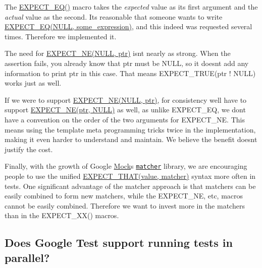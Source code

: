 The {\ttfamily \hyperlink{gtest_8h_a4159019abda84f5366acdb7604ff220a}{E\+X\+P\+E\+C\+T\+\_\+\+E\+Q()}} macro takes the {\itshape expected} value as its first argument and the {\itshape actual} value as the second. It\textquotesingle{}s reasonable that someone wants to write {\ttfamily \hyperlink{gtest_8h_a4159019abda84f5366acdb7604ff220a}{E\+X\+P\+E\+C\+T\+\_\+\+E\+Q(\+N\+U\+L\+L, some\+\_\+expression)}}, and this indeed was requested several times. Therefore we implemented it.

The need for {\ttfamily \hyperlink{gtest_8h_a6ae7443947f25abc58bfcfcfc56b0d75}{E\+X\+P\+E\+C\+T\+\_\+\+N\+E(\+N\+U\+L\+L, ptr)}} isn\textquotesingle{}t nearly as strong. When the assertion fails, you already know that {\ttfamily ptr} must be {\ttfamily N\+U\+LL}, so it doesn\textquotesingle{}t add any information to print ptr in this case. That means {\ttfamily E\+X\+P\+E\+C\+T\+\_\+\+T\+R\+UE(ptr ! N\+U\+LL)} works just as well.

If we were to support {\ttfamily \hyperlink{gtest_8h_a6ae7443947f25abc58bfcfcfc56b0d75}{E\+X\+P\+E\+C\+T\+\_\+\+N\+E(\+N\+U\+L\+L, ptr)}}, for consistency we\textquotesingle{}ll have to support {\ttfamily \hyperlink{gtest_8h_a6ae7443947f25abc58bfcfcfc56b0d75}{E\+X\+P\+E\+C\+T\+\_\+\+N\+E(ptr, N\+U\+L\+L)}} as well, as unlike {\ttfamily E\+X\+P\+E\+C\+T\+\_\+\+EQ}, we don\textquotesingle{}t have a convention on the order of the two arguments for {\ttfamily E\+X\+P\+E\+C\+T\+\_\+\+NE}. This means using the template meta programming tricks twice in the implementation, making it even harder to understand and maintain. We believe the benefit doesn\textquotesingle{}t justify the cost.

Finally, with the growth of Google \hyperlink{classMock}{Mock}\textquotesingle{}s \href{../../CookBook.md#using-matchers-in-google-test-assertions}{\tt matcher} library, we are encouraging people to use the unified {\ttfamily \hyperlink{gmock-matchers_8h_ac31e206123aa702e1152bb2735b31409}{E\+X\+P\+E\+C\+T\+\_\+\+T\+H\+A\+T(value, matcher)}} syntax more often in tests. One significant advantage of the matcher approach is that matchers can be easily combined to form new matchers, while the {\ttfamily E\+X\+P\+E\+C\+T\+\_\+\+NE}, etc, macros cannot be easily combined. Therefore we want to invest more in the matchers than in the {\ttfamily E\+X\+P\+E\+C\+T\+\_\+\+X\+X()} macros.

\subsection*{Does Google Test support running tests in parallel?}

